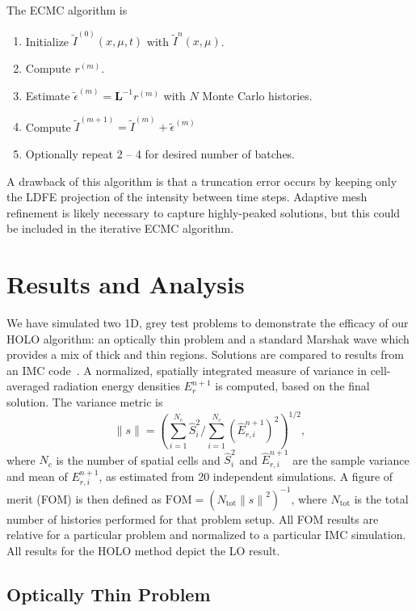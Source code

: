 \documentclass{anstrans}
\newcommand{\B}[1]{\ensuremath{\mathbf{#1}}}
\newcommand{\FOM}{\ensuremath{\text{FOM}}}
\renewcommand{\ss}{\ensuremath{\|s\|}}
\begin{document}
  The ECMC algorithm is
\begin{enumerate}
    \item Initialize $\tilde I^{(0)}(x,\mu,t)$ with $\tilde I^{n}(x,\mu)$.
\item Compute $r^{(m)}$.
\item Estimate $\tilde{\epsilon}^{(m)} = \B L^{-1} r^{(m)}$ with $N$ Monte Carlo histories.
\item Compute $\tilde I^{(m+1)} = \tilde I^{(m)}
+ \tilde\epsilon^{(m)}$
\item Optionally repeat 2 -- 4 for desired number of batches.
\end{enumerate}
A drawback of this algorithm is that
a truncation error occurs by keeping only the LDFE projection of the intensity between
time steps.  Adaptive mesh refinement is likely necessary to capture highly-peaked solutions, but
this could be included in the iterative ECMC algorithm.


\section*{Results and Analysis}

We have simulated two 1D, grey test problems to demonstrate the efficacy of our HOLO
algorithm: an optically thin problem and a standard Marshak wave which provides a mix of thick and
thin regions.  Solutions are compared to results from an IMC code~\cite{jayenne}.
A normalized, spatially integrated measure of variance in cell-averaged radiation energy
densities $E_r^{n+1}$ is computed, based on the final solution. The variance metric is
\begin{equation}
    \ss = \left({{\sum\limits_{i=1}^{N_c}
\hat S_i^2}\bigg/{\sum\limits_{i=1}^{N_c} \left(\hat{E}_{r,i}^{n+1}\right)^2}}\right)^{1/2},
\end{equation}
where $N_c$ is the number of spatial cells and $\hat S_i^2$ and $\hat E_{r,i}^{n+1}$ are the
sample variance and mean of $E_{r,i}^{n+1}$, as estimated from 20 independent simulations.  A figure of merit (FOM) is
then defined as $\FOM = \left({N_{\text{tot}}\ss^2}\right)^{-1}$,
where $N_{\text{tot}}$ is the total number of histories performed for that problem setup. All FOM results
are relative for a particular problem and normalized to a particular IMC
simulation. All results for the HOLO method depict the LO result.

\subsection{Optically Thin Problem}
\end{document}
